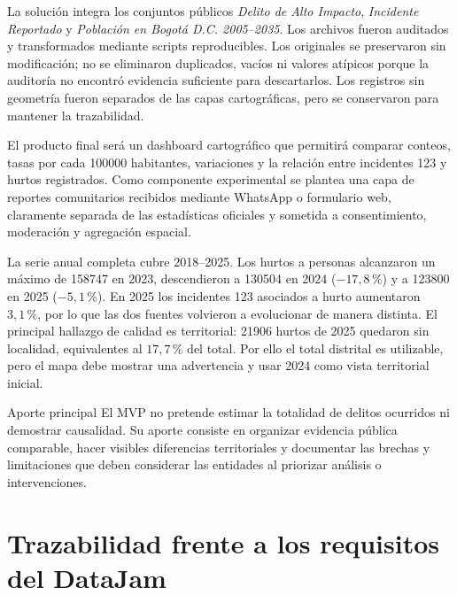 \documentclass[11pt,letterpaper,oneside]{report}
\begin{document}
La solución integra los conjuntos públicos \textit{Delito de Alto Impacto}, \textit{Incidente Reportado} y \textit{Población en Bogotá D.C. 2005--2035}. Los archivos fueron auditados y transformados mediante scripts reproducibles. Los originales se preservaron sin modificación; no se eliminaron duplicados, vacíos ni valores atípicos porque la auditoría no encontró evidencia suficiente para descartarlos. Los registros sin geometría fueron separados de las capas cartográficas, pero se conservaron para mantener la trazabilidad.

El producto final será un dashboard cartográfico que permitirá comparar conteos, tasas por cada \num{100000} habitantes, variaciones y la relación entre incidentes 123 y hurtos registrados. Como componente experimental se plantea una capa de reportes comunitarios recibidos mediante WhatsApp o formulario web, claramente separada de las estadísticas oficiales y sometida a consentimiento, moderación y agregación espacial.

La serie anual completa cubre 2018--2025. Los hurtos a personas alcanzaron un máximo de \num{158747} en 2023, descendieron a \num{130504} en 2024 (\(-17{,}8\,\%\)) y a \num{123800} en 2025 (\(-5{,}1\,\%\)). En 2025 los incidentes 123 asociados a hurto aumentaron \(3{,}1\,\%\), por lo que las dos fuentes volvieron a evolucionar de manera distinta. El principal hallazgo de calidad es territorial: \num{21906} hurtos de 2025 quedaron sin localidad, equivalentes al \(17{,}7\,\%\) del total. Por ello el total distrital es utilizable, pero el mapa debe mostrar una advertencia y usar 2024 como vista territorial inicial.

\begin{keybox}{Aporte principal}
El MVP no pretende estimar la totalidad de delitos ocurridos ni demostrar causalidad. Su aporte consiste en organizar evidencia pública comparable, hacer visibles diferencias territoriales y documentar las brechas y limitaciones que deben considerar las entidades al priorizar análisis o intervenciones.
\end{keybox}

\chapter{Trazabilidad frente a los requisitos del DataJam}
\end{document}
